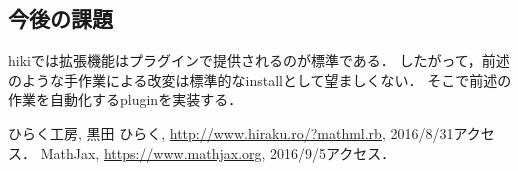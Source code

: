 \documentclass[10pt,a4j,twocolumn]{jsarticle}
\begin{document}
\subsection{今後の課題}
hikiでは拡張機能はプラグインで提供されるのが標準である．
したがって，前述のような手作業による改変は標準的なinstallとして望ましくない．
そこで前述の作業を自動化するpluginを実装する．

\begin{thebibliography}{9}
 ひらく工房, 黒田 ひらく, \url{http://www.hiraku.ro/?mathml.rb}, 2016/8/31アクセス．
 MathJax, \url{https://www.mathjax.org}, 2016/9/5アクセス．
\end{thebibliography}
\end{document}
